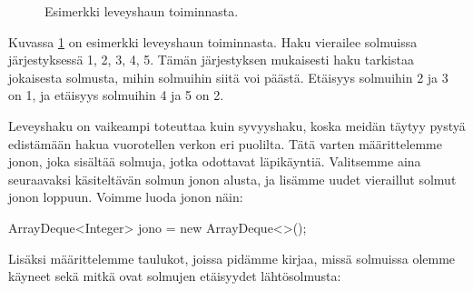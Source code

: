 \begin{figure}
\begin{center}
\end{center}
\caption{Esimerkki leveyshaun toiminnasta.}
\label{fig:levhak}
\end{figure}

Kuvassa \ref{fig:levhak} on esimerkki leveyshaun toiminnasta.
Haku vierailee solmuissa järjestyksessä 1, 2, 3, 4, 5.
Tämän järjestyksen mukaisesti haku tarkistaa jokaisesta solmusta,
mihin solmuihin siitä voi päästä.
Etäisyys solmuihin 2 ja 3 on 1, ja etäisyys solmuihin 4 ja 5 on 2.

Leveyshaku on vaikeampi toteuttaa kuin syvyyshaku,
koska meidän täytyy pystyä edistämään hakua vuorotellen verkon eri puolilta.
Tätä varten määrit\-telemme jonon, joka sisältää solmuja,
jotka odottavat läpikäyntiä.
Valitsemme aina seuraavaksi käsiteltävän solmun jonon alusta,
ja lisämme uudet vieraillut solmut jonon loppuun.
Voimme luoda jonon näin:

\begin{code}
ArrayDeque<Integer> jono = new ArrayDeque<>();
\end{code}

Lisäksi määrittelemme taulukot, joissa pidämme kirjaa,
missä solmuissa olemme käyneet sekä mitkä ovat solmujen
etäisyydet lähtösolmusta:

